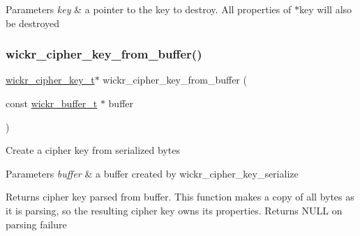 \begin{DoxyParams}{Parameters}
{\em key} & a pointer to the key to destroy. All properties of \textquotesingle{}$\ast$key\textquotesingle{} will also be destroyed \\
\hline
\end{DoxyParams}
\mbox{\label{group__wickr__cipher_ga1c073b87f2141cf35a1d91ba10f9e5ba}} 
\subsubsection{\texorpdfstring{wickr\+\_\+cipher\+\_\+key\+\_\+from\+\_\+buffer()}{wickr\_cipher\_key\_from\_buffer()}}
{\footnotesize\ttfamily \mbox{\hyperlink{structwickr__cipher__key}{wickr\+\_\+cipher\+\_\+key\+\_\+t}}$\ast$ wickr\+\_\+cipher\+\_\+key\+\_\+from\+\_\+buffer (\begin{DoxyParamCaption}\item[{const \mbox{\hyperlink{structwickr__buffer}{wickr\+\_\+buffer\+\_\+t}} $\ast$}]{buffer }\end{DoxyParamCaption})}

Create a cipher key from serialized bytes


\begin{DoxyParams}{Parameters}
{\em buffer} & a buffer created by \textquotesingle{}wickr\+\_\+cipher\+\_\+key\+\_\+serialize\textquotesingle{} \\
\hline
\end{DoxyParams}
\begin{DoxyReturn}{Returns}
cipher key parsed from \textquotesingle{}buffer\textquotesingle{}. This function makes a copy of all bytes as it is parsing, so the resulting cipher key owns its properties. Returns N\+U\+LL on parsing failure 
\end{DoxyReturn}
\mbox{\label{group__wickr__cipher_ga8716aebf03497c379d5ff81fe32cde32}} 
